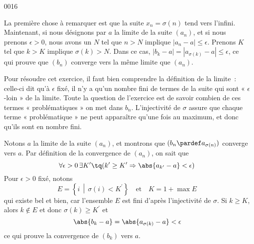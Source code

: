
\begin{corrige}{0016}

La première chose à remarquer est que la suite $x_n=\sigma(n)$ tend vers l'infini. Maintenant, si nous désignons par $a$ la limite de la suite $(a_n)$, et si nous prenons $\epsilon>0$, nous avons un $N$ tel que $n>N$ implique $| a_n-a |\leq\epsilon$. Prenons $K$ tel que $k>K$ implique $\sigma(k)>N$. Dans ce cas, $| b_k-a |=| a_{\sigma(k)}-a |\leq\epsilon$, ce qui prouve que $(b_n)$ converge vers la même limite que $(a_n)$.


\begin{alternative}

\begin{remark}
  Pour résoudre cet exercice, il faut bien comprendre la définition de la limite~: celle-ci dit qu'à $\epsilon$ fixé, il n'y a qu'un nombre fini de termes de la suite qui sont « $\epsilon$-loin » de la limite. Toute la question de l'exercice est de savoir combien de ces termes « problématiques » on met dans $b_n$. L'injectivité de $\sigma$ assure que chaque terme « problématique » ne peut apparaître qu'une fois au maximum, et donc qu'ils sont en nombre fini.
\end{remark}

Notons $a$ la limite de la suite $(a_n)$, et montrons que
$(b_n \pardef a_{\sigma(n)})$ converge vers $a$. Par définition de la
convergence de $(a_n)$, on sait que
\begin{equation*}
  \forall \epsilon > 0\, \exists K^\prime \tq (k^\prime \geq K^\prime \Rightarrow \abs{a_{k^\prime} - a} < \epsilon)
\end{equation*}
Pour $\epsilon > 0$ fixé, notons
\begin{equation*}
  E = \left\{ i \,\middle\vert\, \sigma(i) < K^\prime \right\}
  \quad\text{et}\quad K = 1 + \max E
\end{equation*}
qui existe bel et bien, car l'ensemble $E$ est fini d'après
l'injectivité de $\sigma$. Si $k \geq K$, alors $k \not\in E$ et donc
$\sigma(k) \geq K^\prime$ et
\begin{equation*}
  \abs{b_k - a} = \abs{a_{\sigma(k)} - a} < \epsilon
\end{equation*}
ce qui prouve la convergence de $(b_k)$ vers $a$.
\end{alternative}

\end{corrige}
